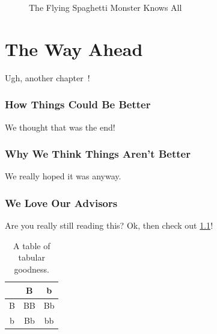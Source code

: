 \documentclass[letterpaper,12pt]{article}
\begin{document}
\begin{figure}
\begin{center}
{			\label{fig:fsm-pirates}
		}
		\caption{\label{fig:fsm}The Flying Spaghetti Monster Knows All}
	\end{center}
\end{figure}

\chapter{The Way Ahead}
Ugh, another chapter~\cite{ref:D}!

\subsection{How Things Could Be Better}
We thought that was the end!

\subsection{Why We Think Things Aren't Better}
We really hoped it was anyway.

\subsection{We Love Our Advisors}
Are you really still reading this? Ok, then check out \ref{tab:magic}!

\begin{table}
	\caption{\label{tab:magic} A table of tabular goodness.}
	\begin{center}
		\begin{tabular}{|c|c|c|}
			\hline
			& B & b \\
			\hline
			B & BB & Bb \\
			\hline
			b & Bb & bb \\
			\hline
		\end{tabular}
	\end{center}
\end{table}
\end{document}
